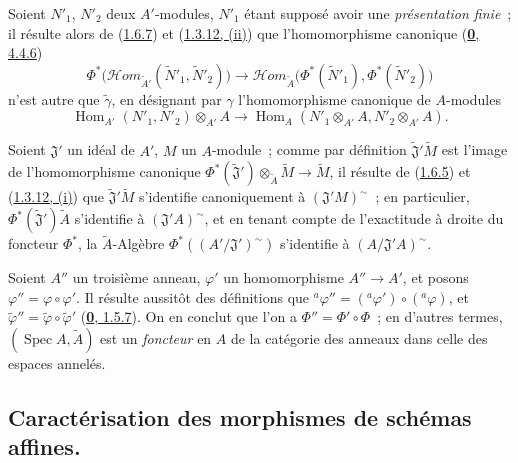 \begin{env}[1.6.8]
\label{I.1.6.8-fr}
Soient $N'_1$, $N'_2$ deux $A'$-modules, $N'_1$ étant supposé avoir une
\emph{présentation finie}~; il résulte alors de
(\hyperref[I.1.6.7-fr]{1.6.7}) et
(\hyperref[I.1.3.12-fr]{1.3.12, (ii)}) que l'homomorphisme canonique
(\hyperref[0.4.4.6-fr]{\textbf{0}, 4.4.6})
\[
  \Phi^*\bigl(\mathscr{H}\!om_{\widetilde{A}'}
    (\widetilde{N}'_1,\widetilde{N}'_2)\bigr)
  \longrightarrow
  \mathscr{H}\!om_{\widetilde A}
    \bigl(\Phi^*(\widetilde{N}'_1),\Phi^*(\widetilde{N}'_2)\bigr)
\]
n'est autre que $\widetilde{\gamma}$, en désignant par $\gamma$
l'homomorphisme canonique de $A$-modules
\[
  \operatorname{Hom}_{A'}(N'_1,N'_2)\otimes_{A'}A
  \longrightarrow
  \operatorname{Hom}_A(N'_1\otimes_{A'}A,N'_2\otimes_{A'}A).
\]
\end{env}

\begin{env}[1.6.9]
\label{I.1.6.9-fr}
Soient $\mathfrak{J}'$ un idéal de $A'$, $M$ un $A$-module~; comme par
définition $\widetilde{\mathfrak{J}}'\widetilde M$ est l'image de
l'homomorphisme canonique
$\Phi^*(\widetilde{\mathfrak{J}}')\otimes_{\widetilde A}\widetilde M
\to\widetilde M$, il résulte de (\hyperref[I.1.6.5-fr]{1.6.5}) et
(\hyperref[I.1.3.12-fr]{1.3.12, (i)}) que
$\widetilde{\mathfrak{J}}'\widetilde M$ s'identifie canoniquement à
$(\mathfrak{J}'M)^{\sim}$~; en particulier,
$\Phi^*(\widetilde{\mathfrak{J}}')\widetilde A$ s'identifie à
$(\mathfrak{J}'A)^{\sim}$, et en tenant compte de l'exactitude à droite du
foncteur $\Phi^*$, la $\widetilde A$-Algèbre
$\Phi^*((A'/\mathfrak{J}')^{\sim})$ s'identifie à
$(A/\mathfrak{J}'A)^{\sim}$.
\end{env}

\begin{env}[1.6.10]
\label{I.1.6.10-fr}
Soient $A''$ un troisième anneau, $\varphi'$ un homomorphisme
$A''\to A'$, et posons $\varphi''=\varphi\circ\varphi'$. Il résulte
aussitôt des définitions que
${}^a\varphi''=({}^a\varphi')\circ({}^a\varphi)$, et
$\widetilde{\varphi}''=\widetilde\varphi\circ\widetilde{\varphi}'$
(\hyperref[0.1.5.7-fr]{\textbf{0}, 1.5.7}). On en conclut que l'on a
$\Phi''=\Phi'\circ\Phi$~; en d'autres termes,
$(\operatorname{Spec} A,\widetilde A)$ est un \emph{foncteur} en $A$ de la
catégorie des anneaux dans celle des espaces annelés.
\end{env}

\subsection{Caractérisation des morphismes de schémas affines.}
\label{subsection:I.1.7-fr}

